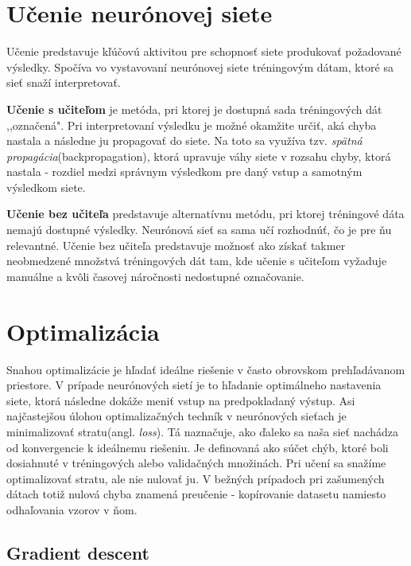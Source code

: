 \section{Učenie neurónovej siete}
\label{analyza_ucenie_nn}

Učenie predstavuje kľúčovú aktivitou pre schopnosť siete produkovať požadované výsledky. Spočíva vo vystavovaní neurónovej siete tréningovým dátam, ktoré sa sieť snaží interpretovať.

\textbf{Učenie s učiteľom} je metóda, pri ktorej je dostupná sada tréningových dát ,,označená". Pri interpretovaní výsledku je možné okamžite určiť, aká chyba nastala a následne ju propagovať do siete. Na toto sa využíva tzv. \textit{spätná propagácia}(backpropagation), ktorá upravuje váhy siete v rozsahu chyby, ktorá nastala - rozdiel medzi správnym výsledkom pre daný vstup a samotným výsledkom siete.
\noindent

\textbf{Učenie bez učiteľa} predstavuje alternatívnu metódu, pri ktorej tréningové dáta nemajú dostupné výsledky. Neurónová sieť sa sama učí rozhodnúť, čo je pre ňu relevantné. Učenie bez učiteľa predstavuje možnosť ako získať takmer neobmedzené množstvá tréningových dát tam, kde učenie s učiteľom vyžaduje manuálne a kvôli časovej náročnosti nedostupné označovanie.
\noindent

\section{Optimalizácia}
\label{optimalization}

Snahou optimalizácie je hľadať ideálne riešenie v často obrovskom prehľadávanom priestore. V prípade neurónových sietí je to hľadanie optimálneho nastavenia siete, ktorá následne dokáže meniť vstup na predpokladaný výstup. Asi najčastejšou úlohou optimalizačných techník v neurónových sieťach je minimalizovať stratu(angl. \textit{loss}). Tá naznačuje, ako ďaleko sa naša sieť nachádza od konvergencie k ideálnemu riešeniu. Je definovaná ako súčet chýb, ktoré boli dosiahnuté v tréningových alebo validačných množinách. Pri učení sa snažíme optimalizovať stratu, ale nie nulovať ju. V bežných prípadoch pri zašumených dátach totiž nulová chyba znamená preučenie - kopírovanie datasetu namiesto odhaľovania vzorov v ňom.

\subsection{Gradient descent}
\label{stochastic_gradient_descent}

